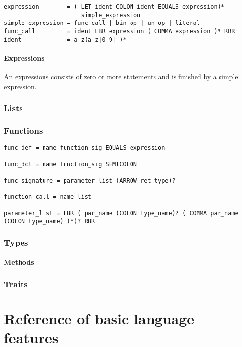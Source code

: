 \documentclass{scrartcl}
\begin{document}
\begin{lstlisting}
expression        = ( LET ident COLON ident EQUALS expression)*
                      simple_expression
simple_expression = func_call | bin_op | un_op | literal
func_call         = ident LBR expression ( COMMA expression )* RBR
ident             = a-z(a-z|0-9|_)*
\end{lstlisting}

\subsection{Expressions}
An expressions consists of zero or more statements and is finished by a simple expression.

\section{Lists}

\section{Functions}
\begin{lstlisting}
func_def = name function_sig EQUALS expression

func_dcl = name function_sig SEMICOLON

func_signature = parameter_list (ARROW ret_type)?

function_call = name list

parameter_list = LBR ( par_name (COLON type_name)? ( COMMA par_name (COLON type_name) )*)? RBR
\end{lstlisting}


\section{Types}

\subsection{Methods}

\section{Traits}





\part{Reference of basic language features}
\end{document}
